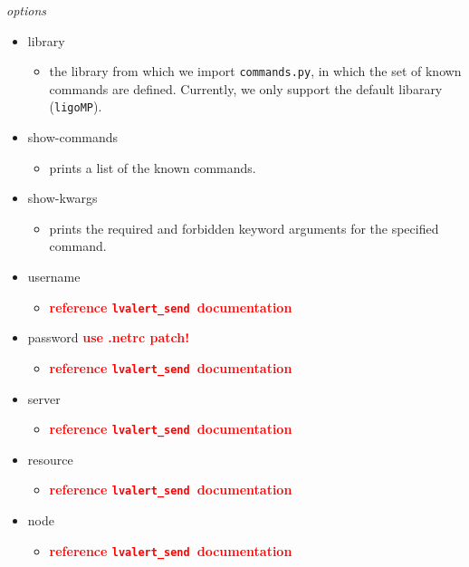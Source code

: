 \documentclass{article}
\newcommand{\FIXME}[1]{\textcolor{red}{\textbf{#1}}}
\newcommand{\lvalertSend}{\texttt{lvalert\_send}}
\begin{document}
\noindent
\textit{options}

\begin{itemize}
    \item{library
        \begin{itemize}
            \item{the library from which we import \texttt{commands.py}, in which the set of known commands are defined. Currently, we only support the default libarary (\texttt{ligoMP}).}
        \end{itemize}
         }
    \item{show-commands
        \begin{itemize}
            \item{prints a list of the known commands.}
        \end{itemize}
         }
    \item{show-kwargs
        \begin{itemize}
            \item{prints the required and forbidden keyword arguments for the specified command.}
        \end{itemize}
         }
    \item{username
        \begin{itemize}
            \item{\FIXME{reference \lvalertSend~documentation}}
        \end{itemize}
         }
    \item{password \FIXME{use .netrc patch!}
        \begin{itemize}
            \item{\FIXME{reference \lvalertSend~documentation}}
        \end{itemize}
         }
    \item{server
        \begin{itemize}
            \item{\FIXME{reference \lvalertSend~documentation}}
        \end{itemize}
         }
    \item{resource
        \begin{itemize}
            \item{\FIXME{reference \lvalertSend~documentation}}
        \end{itemize}
         }
    \item{node
        \begin{itemize}
            \item{\FIXME{reference \lvalertSend~documentation}}

\end{itemize}}
\end{itemize}
\end{document}
